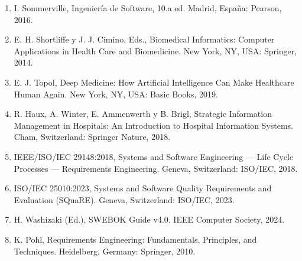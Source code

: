 \documentclass[
]{article}
\begin{document}
\begin{enumerate}
\def\labelenumi{\arabic{enumi}.}
\item
  I. Sommerville, Ingeniería de Software, 10.a ed. Madrid, España:
  Pearson, 2016.
\item
  E. H. Shortliffe y J. J. Cimino, Eds., Biomedical Informatics:
  Computer Applications in Health Care and Biomedicine. New York, NY,
  USA: Springer, 2014.
\item
  E. J. Topol, Deep Medicine: How Artificial Intelligence Can Make
  Healthcare Human Again. New York, NY, USA: Basic Books, 2019.
\item
  R. Haux, A. Winter, E. Ammenwerth y B. Brigl, Strategic Information
  Management in Hospitals: An Introduction to Hospital Information
  Systems. Cham, Switzerland: Springer Nature, 2018.
\item
  IEEE/ISO/IEC 29148:2018, Systems and Software Engineering --- Life
  Cycle Processes --- Requirements Engineering. Geneva, Switzerland:
  ISO/IEC, 2018.
\item
  ISO/IEC 25010:2023, Systems and Software Quality Requirements and
  Evaluation (SQuaRE). Geneva, Switzerland: ISO/IEC, 2023.
\item
  H. Washizaki (Ed.), SWEBOK Guide v4.0. IEEE Computer Society, 2024.
\item
  K. Pohl, Requirements Engineering: Fundamentals, Principles, and
  Techniques. Heidelberg, Germany: Springer, 2010.
\end{enumerate}
\end{document}
